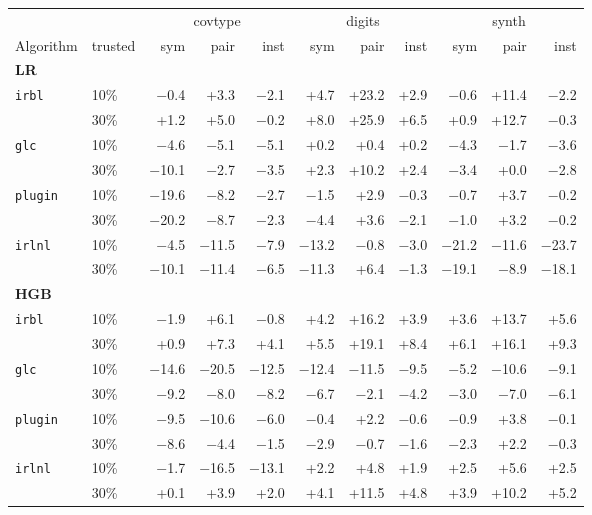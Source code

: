 \begin{tabular}{llrrrrrrrrr}
\toprule
 & & \multicolumn{3}{c}{covtype} & \multicolumn{3}{c}{digits} & \multicolumn{3}{c}{synth} \\
\cmidrule(lr){3-5} \cmidrule(lr){6-8} \cmidrule(lr){9-11}
Algorithm & trusted & sym & pair & inst & sym & pair & inst & sym & pair & inst \\
\midrule
\multicolumn{11}{l}{\textbf{LR}} \\
\texttt{irbl} & 10\% & $-$0.4 & +3.3 & $-$2.1 & +4.7 & +23.2 & +2.9 & $-$0.6 & +11.4 & $-$2.2 \\
 & 30\% & +1.2 & +5.0 & $-$0.2 & +8.0 & +25.9 & +6.5 & +0.9 & +12.7 & $-$0.3 \\
\texttt{glc} & 10\% & $-$4.6 & $-$5.1 & $-$5.1 & +0.2 & +0.4 & +0.2 & $-$4.3 & $-$1.7 & $-$3.6 \\
 & 30\% & $-$10.1 & $-$2.7 & $-$3.5 & +2.3 & +10.2 & +2.4 & $-$3.4 & +0.0 & $-$2.8 \\
\texttt{plugin} & 10\% & $-$19.6 & $-$8.2 & $-$2.7 & $-$1.5 & +2.9 & $-$0.3 & $-$0.7 & +3.7 & $-$0.2 \\
 & 30\% & $-$20.2 & $-$8.7 & $-$2.3 & $-$4.4 & +3.6 & $-$2.1 & $-$1.0 & +3.2 & $-$0.2 \\
\texttt{irlnl} & 10\% & $-$4.5 & $-$11.5 & $-$7.9 & $-$13.2 & $-$0.8 & $-$3.0 & $-$21.2 & $-$11.6 & $-$23.7 \\
 & 30\% & $-$10.1 & $-$11.4 & $-$6.5 & $-$11.3 & +6.4 & $-$1.3 & $-$19.1 & $-$8.9 & $-$18.1 \\
\midrule\multicolumn{11}{l}{\textbf{HGB}} \\
\texttt{irbl} & 10\% & $-$1.9 & +6.1 & $-$0.8 & +4.2 & +16.2 & +3.9 & +3.6 & +13.7 & +5.6 \\
 & 30\% & +0.9 & +7.3 & +4.1 & +5.5 & +19.1 & +8.4 & +6.1 & +16.1 & +9.3 \\
\texttt{glc} & 10\% & $-$14.6 & $-$20.5 & $-$12.5 & $-$12.4 & $-$11.5 & $-$9.5 & $-$5.2 & $-$10.6 & $-$9.1 \\
 & 30\% & $-$9.2 & $-$8.0 & $-$8.2 & $-$6.7 & $-$2.1 & $-$4.2 & $-$3.0 & $-$7.0 & $-$6.1 \\
\texttt{plugin} & 10\% & $-$9.5 & $-$10.6 & $-$6.0 & $-$0.4 & +2.2 & $-$0.6 & $-$0.9 & +3.8 & $-$0.1 \\
 & 30\% & $-$8.6 & $-$4.4 & $-$1.5 & $-$2.9 & $-$0.7 & $-$1.6 & $-$2.3 & +2.2 & $-$0.3 \\
\texttt{irlnl} & 10\% & $-$1.7 & $-$16.5 & $-$13.1 & +2.2 & +4.8 & +1.9 & +2.5 & +5.6 & +2.5 \\
 & 30\% & +0.1 & +3.9 & +2.0 & +4.1 & +11.5 & +4.8 & +3.9 & +10.2 & +5.2 \\
\bottomrule
\end{tabular}
